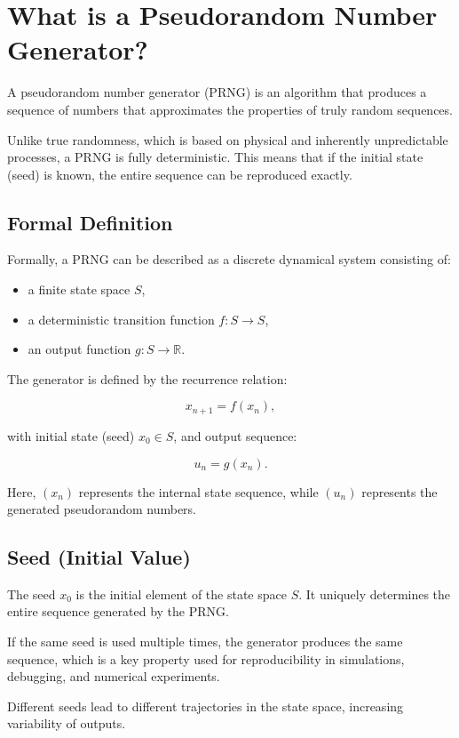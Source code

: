 \section{What is a Pseudorandom Number Generator?}

A pseudorandom number generator (PRNG) is an algorithm that produces a sequence of numbers that approximates the properties of truly random sequences.

Unlike true randomness, which is based on physical and inherently unpredictable processes, a PRNG is fully deterministic. This means that if the initial state (seed) is known, the entire sequence can be reproduced exactly.

\subsection{Formal Definition}

Formally, a PRNG can be described as a discrete dynamical system consisting of:

\begin{itemize}
    \item a finite state space $S$,
    \item a deterministic transition function $f : S \to S$,
    \item an output function $g : S \to \mathbb{R}$.
\end{itemize}

The generator is defined by the recurrence relation:

$$
x_{n+1} = f(x_n),
$$

with initial state (seed) $x_0 \in S$, and output sequence:

$$
u_n = g(x_n).
$$

Here, $(x_n)$ represents the internal state sequence, while $(u_n)$ represents the generated pseudorandom numbers.

\subsection{Seed (Initial Value)}

The seed $x_0$ is the initial element of the state space $S$. It uniquely determines the entire sequence generated by the PRNG.

If the same seed is used multiple times, the generator produces the same sequence, which is a key property used for reproducibility in simulations, debugging, and numerical experiments.

Different seeds lead to different trajectories in the state space, increasing variability of outputs.

